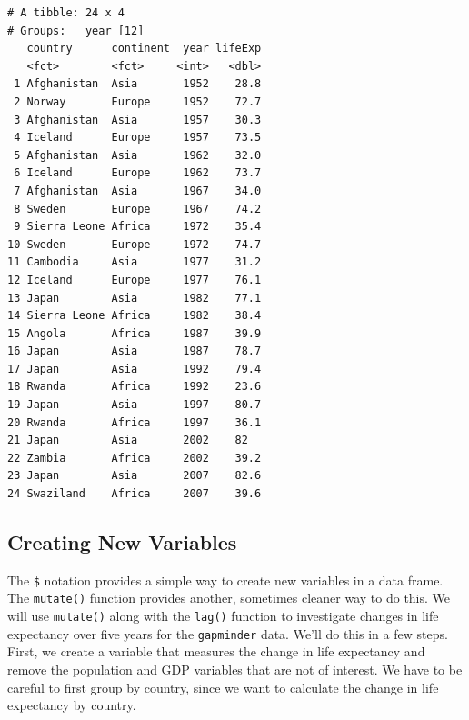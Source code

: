 \documentclass[]{krantz}
\makeatletter
\newenvironment{Shaded}{\begin{snugshade}}{\end{snugshade}}
\newcommand{\DataTypeTok}[1]{\textcolor[rgb]{0.27,0.27,0.27}{#1}}
\newcommand{\KeywordTok}[1]{\textcolor[rgb]{0.27,0.27,0.27}{\textbf{#1}}}
\newcommand{\NormalTok}[1]{#1}
\newcommand{\OperatorTok}[1]{\textcolor[rgb]{0.43,0.43,0.43}{\textbf{#1}}}
\newcommand{\StringTok}[1]{\textcolor[rgb]{0.5,0.5,0.5}{#1}}
\newenvironment{kframe}{%
\medskip{}
\setlength{\fboxsep}{.8em}
 \def\at@end@of@kframe{}%
 \ifinner\ifhmode%
  \def\at@end@of@kframe{\end{minipage}}%
  \begin{minipage}{\columnwidth}%
 \fi\fi%
 \def\FrameCommand##1{\hskip\@totalleftmargin \hskip-\fboxsep
 \colorbox{shadecolor}{##1}\hskip-\fboxsep
     \hskip-\linewidth \hskip-\@totalleftmargin \hskip\columnwidth}%
 \MakeFramed {\advance\hsize-\width
   \@totalleftmargin\z@ \linewidth\hsize
   \@setminipage}}%
 {\par\unskip\endMakeFramed%
 \at@end@of@kframe}
\renewenvironment{Shaded}{\begin{kframe}}{\end{kframe}}
\makeatother
\begin{document}
\begin{verbatim}
# A tibble: 24 x 4
# Groups:   year [12]
   country      continent  year lifeExp
   <fct>        <fct>     <int>   <dbl>
 1 Afghanistan  Asia       1952    28.8
 2 Norway       Europe     1952    72.7
 3 Afghanistan  Asia       1957    30.3
 4 Iceland      Europe     1957    73.5
 5 Afghanistan  Asia       1962    32.0
 6 Iceland      Europe     1962    73.7
 7 Afghanistan  Asia       1967    34.0
 8 Sweden       Europe     1967    74.2
 9 Sierra Leone Africa     1972    35.4
10 Sweden       Europe     1972    74.7
11 Cambodia     Asia       1977    31.2
12 Iceland      Europe     1977    76.1
13 Japan        Asia       1982    77.1
14 Sierra Leone Africa     1982    38.4
15 Angola       Africa     1987    39.9
16 Japan        Asia       1987    78.7
17 Japan        Asia       1992    79.4
18 Rwanda       Africa     1992    23.6
19 Japan        Asia       1997    80.7
20 Rwanda       Africa     1997    36.1
21 Japan        Asia       2002    82  
22 Zambia       Africa     2002    39.2
23 Japan        Asia       2007    82.6
24 Swaziland    Africa     2007    39.6
\end{verbatim}

\hypertarget{creating-new-variables}{%
\subsection{Creating New Variables}\label{creating-new-variables}}

The \texttt{\$} notation provides a simple way to create new variables in a data frame. The \texttt{mutate()} function provides another, sometimes cleaner way to do this. We will use \texttt{mutate()} along with the \texttt{lag()} function to investigate changes in life expectancy over five years for the \texttt{gapminder} data. We'll do this in a few steps. First, we create a variable that measures the change in life expectancy and remove the population and GDP variables that are not of interest. We have to be careful to first group by country, since we want to calculate the change in life expectancy by country.

\begin{Shaded}
\end{Shaded}
\end{document}
